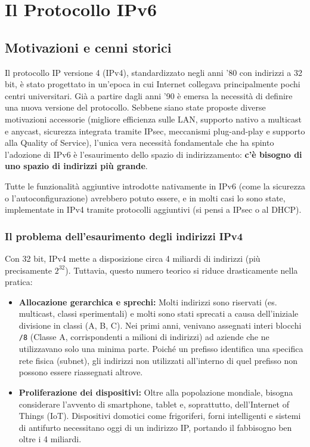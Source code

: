 \chapter{Il Protocollo IPv6}

\section{Motivazioni e cenni storici}

Il protocollo IP versione 4 (IPv4), standardizzato negli anni '80 con indirizzi a 32 bit, è stato progettato in un'epoca in cui Internet collegava principalmente pochi centri universitari. Già a partire dagli anni '90 è emersa la necessità di definire una nuova versione del protocollo. Sebbene siano state proposte diverse motivazioni accessorie (migliore efficienza sulle LAN, supporto nativo a multicast e anycast, sicurezza integrata tramite IPsec, meccanismi plug-and-play e supporto alla Quality of Service), l'unica vera necessità fondamentale che ha spinto l'adozione di IPv6 è l'esaurimento dello spazio di indirizzamento: \textbf{c'è bisogno di uno spazio di indirizzi più grande}.

Tutte le funzionalità aggiuntive introdotte nativamente in IPv6 (come la sicurezza o l'autoconfigurazione) avrebbero potuto essere, e in molti casi lo sono state, implementate in IPv4 tramite protocolli aggiuntivi (si pensi a IPsec o al DHCP).

\subsection{Il problema dell'esaurimento degli indirizzi IPv4}
Con 32 bit, IPv4 mette a disposizione circa 4 miliardi di indirizzi (più precisamente $2^{32}$). Tuttavia, questo numero teorico si riduce drasticamente nella pratica:
\begin{itemize}
    \item \textbf{Allocazione gerarchica e sprechi:} Molti indirizzi sono riservati (es. multicast, classi sperimentali) e molti sono stati sprecati a causa dell'iniziale divisione in classi (A, B, C). Nei primi anni, venivano assegnati interi blocchi \texttt{/8} (Classe A, corrispondenti a milioni di indirizzi) ad aziende che ne utilizzavano solo una minima parte. Poiché un prefisso identifica una specifica rete fisica (subnet), gli indirizzi non utilizzati all'interno di quel prefisso non possono essere riassegnati altrove.
    \item \textbf{Proliferazione dei dispositivi:} Oltre alla popolazione mondiale, bisogna considerare l'avvento di smartphone, tablet e, soprattutto, dell'Internet of Things (IoT). Dispositivi domotici come frigoriferi, forni intelligenti e sistemi di antifurto necessitano oggi di un indirizzo IP, portando il fabbisogno ben oltre i 4 miliardi.
\end{itemize}


